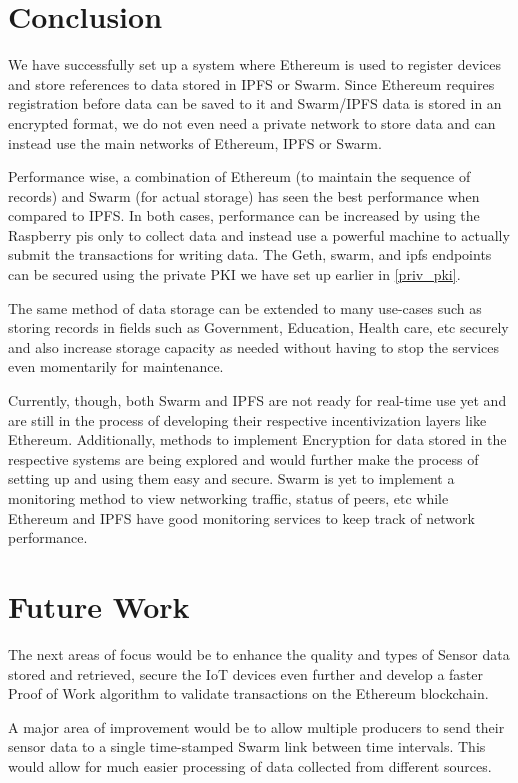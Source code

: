 \documentclass[11pt,openright]{report}
\begin{document}
\section{Conclusion}
We have successfully set up a system where Ethereum is used to register devices and store references to data stored in IPFS or Swarm. Since Ethereum requires registration before data can be saved to it and Swarm/IPFS data is stored in an encrypted format, we do not even need a private network to store data and can instead use the main networks of Ethereum, IPFS or Swarm.

Performance wise, a combination of Ethereum (to maintain the sequence of records) and Swarm (for actual storage) has seen the best performance when compared to IPFS. In both cases, performance can be increased by using the Raspberry pis only to collect data and instead use a powerful machine to actually submit the transactions for writing data. The Geth, swarm, and ipfs endpoints can be secured using the private PKI we have set up earlier in \ref{priv_pki}.

The same method of data storage can be extended to many use-cases such as storing records in fields such as Government, Education, Health care, etc securely and also increase storage capacity as needed without having to stop the services even momentarily for maintenance.

Currently, though, both Swarm and IPFS are not ready for real-time use yet and are still in the process of developing their respective incentivization layers \cite{ethersphere2016sw3} like Ethereum. Additionally, methods to implement Encryption for data stored in the respective systems are being explored and would further make the process of setting up and using them easy and secure. Swarm is yet to implement a monitoring method to view networking traffic, status of peers, etc while Ethereum and IPFS have good monitoring services to keep track of network performance.

\section{Future Work}
The next areas of focus would be to enhance the quality and types of Sensor data stored and retrieved, secure the IoT devices even further and develop a faster Proof of Work algorithm to validate transactions on the Ethereum blockchain. 

A major area of improvement would be to allow multiple producers to send their sensor data to a single time-stamped Swarm link between time intervals. This would allow for much easier processing of data collected from different sources.
\end{document}
